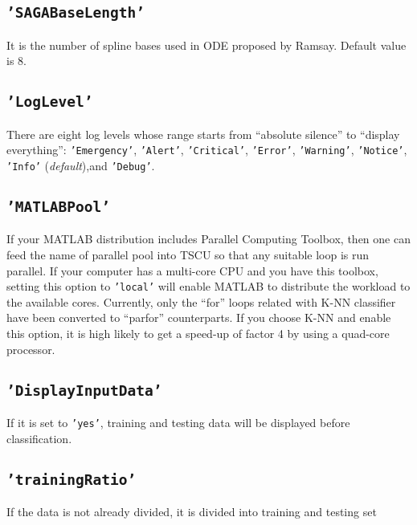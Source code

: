 \documentclass{article}
\begin{document}
\subsection{\texttt{'SAGABaseLength'}} 
It is the number of spline bases used in ODE proposed by Ramsay. Default value is $8$.

\subsection{\texttt{'LogLevel'}}
There are eight log levels whose range starts from ``absolute silence'' to ``display everything'': \texttt{'Emergency'}, \texttt{'Alert'}, \texttt{'Critical'}, \texttt{'Error'}, \texttt{'Warning'}, \texttt{'Notice'}, \texttt{'Info'} ({\it default}),and \texttt{'Debug'}.  

\subsection{\texttt{'MATLABPool'}}
If your MATLAB distribution includes Parallel Computing Toolbox, then one can feed the name of parallel pool into TSCU so that any suitable loop is run parallel. If your computer has a multi-core CPU and you have this toolbox, setting this option to \texttt{'local'} will enable MATLAB to distribute the workload to the available cores. Currently, only the ``for'' loops related with K-NN classifier have been converted to ``parfor'' counterparts. If you choose K-NN and enable this option, it is high likely to get a speed-up of factor 4 by using a quad-core processor.

\subsection{\texttt{'DisplayInputData'}}
If it is set to \texttt{'yes'}, training and testing data will be displayed before classification.

\subsection{\texttt{'trainingRatio'}}
If the data is not already divided, it is divided  into training and testing set
\end{document}
